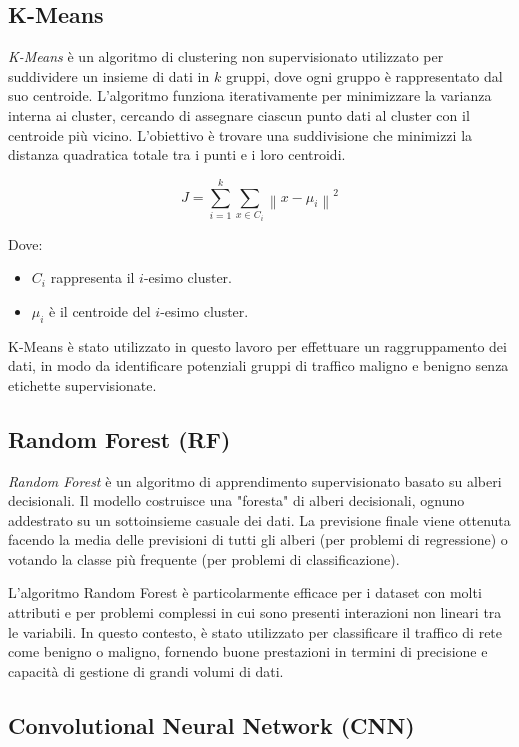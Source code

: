 \subsection{K-Means}

\textit{K-Means} è un algoritmo di clustering non supervisionato utilizzato per suddividere un insieme di dati in $k$ gruppi, dove ogni gruppo è rappresentato dal suo centroide. L'algoritmo funziona iterativamente per minimizzare la varianza interna ai cluster, cercando di assegnare ciascun punto dati al cluster con il centroide più vicino. L'obiettivo è trovare una suddivisione che minimizzi la distanza quadratica totale tra i punti e i loro centroidi.

\[
J = \sum_{i=1}^{k} \sum_{x \in C_i} \left\| x - \mu_i \right\|^2
\]

Dove:
\begin{itemize}
    \item $C_i$ rappresenta il $i$-esimo cluster.
    \item $\mu_i$ è il centroide del $i$-esimo cluster.
\end{itemize}

K-Means è stato utilizzato in questo lavoro per effettuare un raggruppamento dei dati, in modo da identificare potenziali gruppi di traffico maligno e benigno senza etichette supervisionate.
\cite{K_Means}

\subsection{Random Forest (RF)}

\textit{Random Forest} è un algoritmo di apprendimento supervisionato basato su alberi decisionali. Il modello costruisce una "foresta" di alberi decisionali, ognuno addestrato su un sottoinsieme casuale dei dati. La previsione finale viene ottenuta facendo la media delle previsioni di tutti gli alberi (per problemi di regressione) o votando la classe più frequente (per problemi di classificazione).

L'algoritmo Random Forest è particolarmente efficace per i dataset con molti attributi e per problemi complessi in cui sono presenti interazioni non lineari tra le variabili. In questo contesto, è stato utilizzato per classificare il traffico di rete come benigno o maligno, fornendo buone prestazioni in termini di precisione e capacità di gestione di grandi volumi di dati. \cite{RandomForest}

\subsection{Convolutional Neural Network (CNN)}

